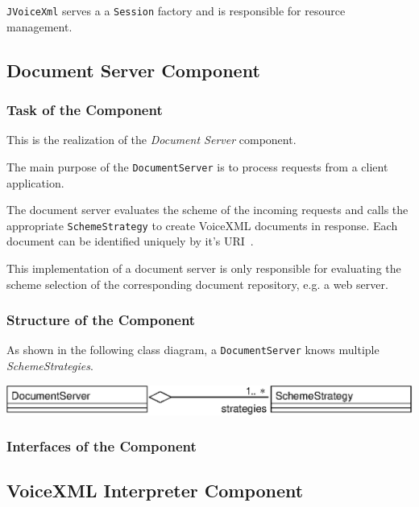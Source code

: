\documentclass[11pt,a4paper]{article}
\begin{document}
\texttt{JVoiceXml} serves a a \texttt{Session} factory and is responsible
for resource management. 

\subsection{Document Server Component}
\label{sec:docum-serv-comp}

\subsubsection{Task of the Component}

This is the realization of the \emph{Document Server} component.

The main purpose of the \texttt{DocumentServer} is to process requests from a 
client application.

The document server evaluates the scheme of the incoming requests and
calls the appropriate \texttt{SchemeStrategy} to create VoiceXML
documents in response. Each document can be identified uniquely by
it's URI~\cite{w3.org:addressing}.

This implementation of a document server is only responsible for
evaluating the scheme selection of the corresponding document repository,
e.g. a web server.

\subsubsection{Structure of the Component}

As shown in the following class diagram, a \texttt{DocumentServer}
knows multiple \emph{SchemeStrategies}.

\begin{center}
\includegraphics[scale=0.8]{class-documentserver.eps}
\end{center}

\subsubsection{Interfaces of the Component}

\subsection{VoiceXML Interpreter Component}
\label{sec:voic-interpr-comp}
\end{document}
